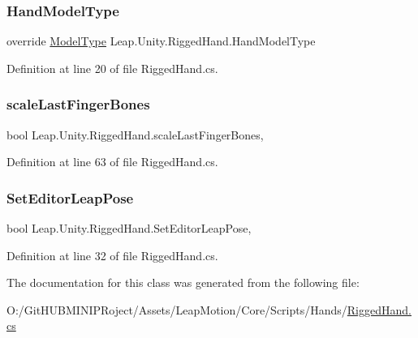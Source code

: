 \subsubsection{\texorpdfstring{HandModelType}{HandModelType}}
{\footnotesize\ttfamily override \mbox{\hyperlink{namespace_leap_1_1_unity_a186e5eb0a2b743f1f6b79346f0ab8ad0}{Model\+Type}} Leap.\+Unity.\+Rigged\+Hand.\+Hand\+Model\+Type\hspace{0.3cm}{\ttfamily [get]}}



Definition at line 20 of file Rigged\+Hand.\+cs.

\mbox{\label{class_leap_1_1_unity_1_1_rigged_hand_a5b746af2657245a3e8cad12b081d1fe0}} 
\subsubsection{\texorpdfstring{scaleLastFingerBones}{scaleLastFingerBones}}
{\footnotesize\ttfamily bool Leap.\+Unity.\+Rigged\+Hand.\+scale\+Last\+Finger\+Bones\hspace{0.3cm}{\ttfamily [get]}, {\ttfamily [set]}}



Definition at line 63 of file Rigged\+Hand.\+cs.

\mbox{\label{class_leap_1_1_unity_1_1_rigged_hand_ab8de11dc599037ace3a7bce66cdb8b94}} 
\subsubsection{\texorpdfstring{SetEditorLeapPose}{SetEditorLeapPose}}
{\footnotesize\ttfamily bool Leap.\+Unity.\+Rigged\+Hand.\+Set\+Editor\+Leap\+Pose\hspace{0.3cm}{\ttfamily [get]}, {\ttfamily [set]}}



Definition at line 32 of file Rigged\+Hand.\+cs.



The documentation for this class was generated from the following file\+:\begin{DoxyCompactItemize}
\item 
O\+:/\+Git\+H\+U\+B\+M\+I\+N\+I\+P\+Roject/\+Assets/\+Leap\+Motion/\+Core/\+Scripts/\+Hands/\mbox{\hyperlink{_rigged_hand_8cs}{Rigged\+Hand.\+cs}}\end{DoxyCompactItemize}
